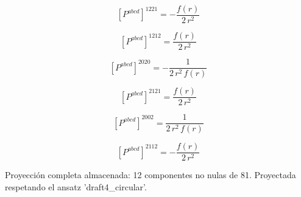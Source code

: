 \documentclass[11pt]{article}
\begin{document}
\par\smallskip
\begin{dmath*}[breakdepth={5}]
\left[P^{abcd}\right]^{1221} = -\frac{f\!\left(r\right)}{2\,{r}^{2}}
\end{dmath*}
\par\smallskip
\begin{dmath*}[breakdepth={5}]
\left[P^{abcd}\right]^{1212} = \frac{f\!\left(r\right)}{2\,{r}^{2}}
\end{dmath*}
\par\smallskip
\begin{dmath*}[breakdepth={5}]
\left[P^{abcd}\right]^{2020} = -\frac{1}{2\,{r}^{2}\,f\!\left(r\right)}
\end{dmath*}
\par\smallskip
\begin{dmath*}[breakdepth={5}]
\left[P^{abcd}\right]^{2121} = \frac{f\!\left(r\right)}{2\,{r}^{2}}
\end{dmath*}
\par\smallskip
\begin{dmath*}[breakdepth={5}]
\left[P^{abcd}\right]^{2002} = \frac{1}{2\,{r}^{2}\,f\!\left(r\right)}
\end{dmath*}
\par\smallskip
\begin{dmath*}[breakdepth={5}]
\left[P^{abcd}\right]^{2112} = -\frac{f\!\left(r\right)}{2\,{r}^{2}}
\end{dmath*}
\par\smallskip
Proyección completa almacenada: 12 componentes no nulas de 81. Proyectada respetando el ansatz 'draft4\_circular'.\par\medskip
{}
\end{document}

